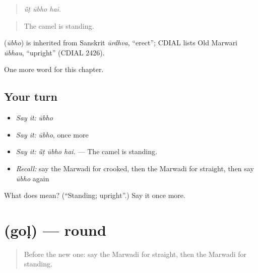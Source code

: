 \begin{quote}
  
\end{quote}

\begin{quote}
\emph{ū̃ṭ ūbho hai.}
\end{quote}

\begin{quote}
The camel is standing.
\end{quote}

\begin{cousinweb}
\textbf{} (\emph{ūbho}) is inherited from Sanskrit \emph{ūrdhva}, \textquotedblleft{}erect\textquotedblright{}; CDIAL lists Old Marwari \emph{ūbhau}, \textquotedblleft{}upright\textquotedblright{} (CDIAL 2426).
\end{cousinweb}

\begin{grammarlens}[title={What you've built}]
One more word for this chapter.
\end{grammarlens}

\subsection*{Your turn}
\begin{itemize}
\raggedright
  \item \emph{Say it:} \emph{ūbho}
  \item \emph{Say it:} \emph{ūbho}, once more
  \item \emph{Say it:} \emph{ū̃ṭ ūbho hai.} — The camel is standing.
  \item \emph{Recall:} say the Marwadi for crooked, then the Marwadi for straight, then say \emph{ūbho} again
\end{itemize}

\begin{tcolorbox}[breakable,colback=teal!4,colframe=teal!35!black,title={Before you move on}]
What does  mean? (\textquotedblleft{}Standing; upright\textquotedblright{}.) Say it once more.
\end{tcolorbox}
\section[\texorpdfstring{\mw{गोळ} (goḷ)}{गोळ (goḷ)}]{ (goḷ) — round}

\label{lesson:MW-C231-gol}



\begin{quote}
Before the new one: say the Marwadi for straight, then the Marwadi for standing.
\end{quote}

